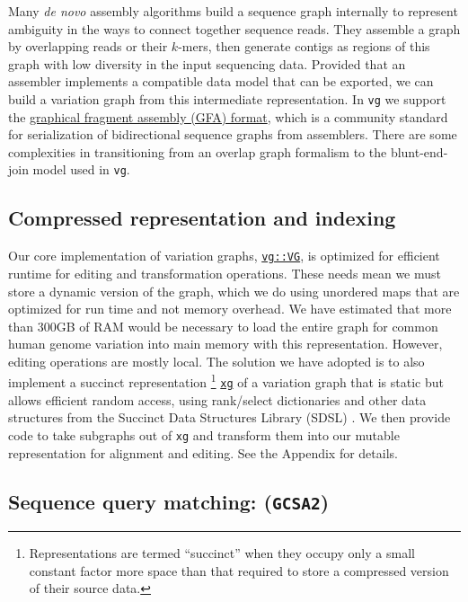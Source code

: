 \documentclass[12pt]{article}
\begin{document}
Many \emph{de novo} assembly algorithms build a sequence graph internally to represent ambiguity in the ways to connect together sequence reads.
They assemble a graph by overlapping reads or their $k$-mers, then generate contigs as regions of this graph with low diversity in the input sequencing data.
Provided that an assembler implements a compatible data model that can be exported, we can build a variation graph from this intermediate representation.
In {\tt vg} we support the \href{https://github.com/pmelsted/GFA-spec}{graphical fragment assembly (GFA) format}, which is a community standard for serialization of bidirectional sequence graphs from assemblers.  There are some complexities in transitioning from an overlap graph formalism to the blunt-end-join model used in {\tt vg}.

\subsection{Compressed representation and indexing}

Our core implementation of variation graphs, \href{https://github.com/vgteam/vg/blob/fbcb6e62/src/vg.hpp#L196-L1146}{{\tt vg::VG}}, is optimized for efficient runtime for editing and transformation operations.
These needs mean we must store a dynamic version of the graph, which we do using unordered maps that are optimized for run time and not memory overhead.
We have estimated that more than 300GB of RAM would be necessary to load the entire graph for common human genome variation into main memory with this representation.
However, editing operations are mostly local.  
The solution we have adopted is to also implement a succinct representation \footnote{Representations are termed ``succinct'' when they occupy only a small constant factor more space than that required to store a compressed version of their source data.}  \href{https://github.com/vgteam/xg}{{\tt xg}} of a variation graph that is static but allows efficient random access, using rank/select dictionaries and other data structures from the Succinct Data Structures Library (SDSL) \cite{sdsl2014}. 
We then provide code to take subgraphs out of {\tt xg} and transform them into our mutable representation for alignment and editing.  See the Appendix for details.

\subsection{Sequence query matching: ({\tt GCSA2})}
\label{sec:GCSA2}
\end{document}
